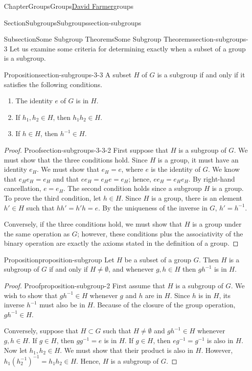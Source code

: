 \documentclass[oneside,10pt,]{book}
\numberwithin{equation}{section}
\begin{document}
\begin{chapterptx}{Chapter}{Groups}{}{Groups}{\hyperlink{dfarmer}{David Farmer}}{}{groups}
\begin{sectionptx}{Section}{Subgroups}{}{Subgroups}{}{}{section-subgroups}
\begin{subsectionptx}{Subsection}{Some Subgroup Theorems}{}{Some Subgroup Theorems}{}{}{section-subgroups-3}
Let us examine some criteria for determining exactly when a subset of a group is a subgroup.%
\begin{proposition}{Proposition}{}{}{section-subgroups-3-3}%
A subset \(H\) of \(G\) is a subgroup if and only if it satisfies the following conditions.%
\begin{enumerate}
\item{}The identity \(e\) of \(G\) is in \(H\).%
\item{}If \(h_1, h_2 \in H\), then \(h_1h_2 \in H\).%
\item{}If \(h \in H\), then \(h^{-1} \in H\).%
\end{enumerate}
%
\end{proposition}
\begin{proof}{Proof}{}{section-subgroups-3-3-2}
First suppose that \(H\) is a subgroup of \(G\).  We must show that the three conditions hold.  Since \(H\) is a group, it must have an identity \(e_H\).  We must show that \(e_H = e\), where \(e\) is the identity of \(G\). We know that \(e_H e_H = e_H\) and that \(ee_H = e_H e = e_H\); hence, \(ee_H = e_H e_H\).  By right-hand cancellation, \(e =e_H\).  The second condition holds since a subgroup \(H\) is a group.  To prove the third condition, let \(h \in H\).  Since \(H\) is a group, there is  an element \(h' \in H\) such that \(hh' = h'h = e\).  By the uniqueness  of the inverse in \(G\), \(h' = h^{-1}\).%
\par
Conversely, if the three conditions hold, we must show that \(H\) is a group under the same operation as \(G\); however, these conditions plus the associativity of the binary operation are exactly the axioms stated in the definition of a group.%
\end{proof}
\begin{proposition}{Proposition}{}{}{proposition-subgroup}%
Let \(H\) be a subset of a group \(G\).  Then \(H\) is a subgroup of \(G\) if and only if \(H \neq \emptyset\), and whenever \(g, h \in H\) then \(gh^{-1}\) is in \(H\).%
\end{proposition}
\begin{proof}{Proof}{}{proposition-subgroup-2}
First assume that \(H\) is a subgroup of \(G\).  We wish to show that \(gh^{-1} \in H\) whenever \(g\) and \(h\) are in \(H\).  Since \(h\) is in \(H\), its inverse \(h^{-1}\) must also be in \(H\).  Because of the closure of the group operation, \(gh^{-1} \in H\).%
\par
Conversely, suppose that \(H \subset G\) such that \(H \neq \emptyset\) and  \(g h^{-1} \in H\) whenever \(g, h \in H\).  If \(g \in H\), then \(gg^{-1} = e\) is in \(H\).  If \(g \in H\), then \(eg^{-1} = g^{-1}\) is also in \(H\). Now let \(h_1, h_2 \in H\). We must show that their product is also in \(H\).  However, \(h_1(h_2^{-1})^{-1} = h_1 h_2 \in H\).  Hence, \(H\) is a subgroup of \(G\).%

\end{proof}
\end{subsectionptx}
\end{sectionptx}
\end{chapterptx}
\end{document}
